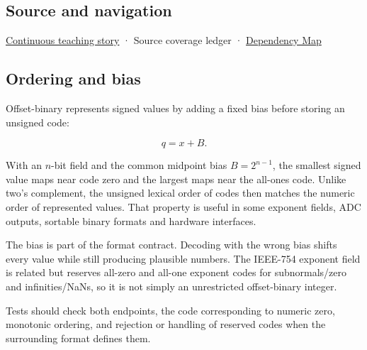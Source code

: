 \subsection{Source and navigation}\label{appendix-53a8cfb25f8d-source-and-navigation}

\hyperref[01-foundations-i-ch001-choosing-what-information-to-keep]{Continuous teaching story} · {Source coverage ledger} · \hyperref[appendix-4ad47bdd269a]{Dependency Map}

\subsection{Ordering and bias}\label{appendix-53a8cfb25f8d-ordering-and-bias}

Offset-binary represents signed values by adding a fixed bias before storing an unsigned code:

\[q=x+B.\]

With an \(n\)-bit field and the common midpoint bias \(B=2^{n-1}\), the smallest signed value maps near code zero and the largest maps near the all-ones code. Unlike two's complement, the unsigned lexical order of codes then matches the numeric order of represented values. That property is useful in some exponent fields, ADC outputs, sortable binary formats and hardware interfaces.

The bias is part of the format contract. Decoding with the wrong bias shifts every value while still producing plausible numbers. The IEEE-754 exponent field is related but reserves all-zero and all-one exponent codes for subnormals/zero and infinities/NaNs, so it is not simply an unrestricted offset-binary integer.

Tests should check both endpoints, the code corresponding to numeric zero, monotonic ordering, and rejection or handling of reserved codes when the surrounding format defines them.
